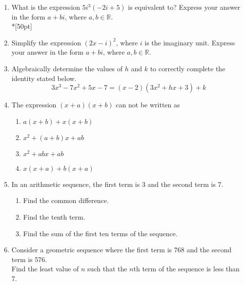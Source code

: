 \documentclass[12pt, oneside]{article}
\begin{document}
\begin{enumerate}
\item What is the expression $5i^3(-2i+5)$ is equivalent to? Express your answer in the form $a+bi$, where $a, b \in \mathbb{R}$.\\*[50pt]  %

\item Simplify the expression $(2x - i)^2$, where $i$ is the imaginary unit. Express your answer in the form $a+bi$, where $a, b \in \mathbb{R}$.\\[50pt] %

\item Algebraically determine the values of $h$ and $k$ to correctly complete the identity stated below.
\[3x^3-7x^2+5x-7=(x-2)(3x^2+hx+3)+k\] %

\newpage
\item The expression $(x + a)(x + b)$ can not be written as
\begin{enumerate}
    \item $a(x + b)+ x(x + b)$
    \item $x^2 + (a + b)x + ab$ 
    \item  $x^2 + abx + ab$  
    \item $x(x + a)+ b(x + a)$
\end{enumerate}

\item In an arithmetic sequence, the first term is 3 and the second term is 7.
\begin{enumerate}
    \item Find the common difference.
        \begin{flushright}[2]\end{flushright}
    \item Find the tenth term.
        \begin{flushright}[2]\end{flushright}
    \item Find the sum of the first ten terms of the sequence. 
        \begin{flushright}[2]\end{flushright}
\end{enumerate}

\item Consider a geometric sequence where the first term is 768 and the second term is 576.\\
Find the least value of $n$ such that the $n$th term of the sequence is less than 7.
    \begin{flushright}[6]\end{flushright}


\end{enumerate}
\end{document}
